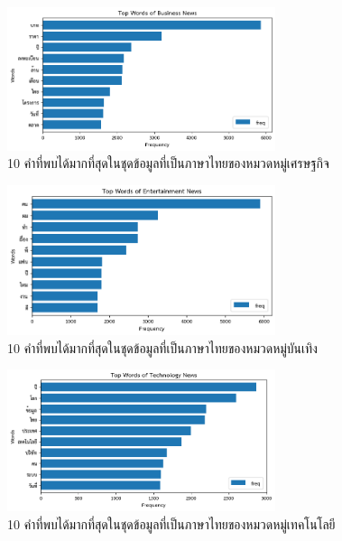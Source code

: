 \documentclass[12pt,oneside,openright,a4paper]{cpe-thai-project}
\begin{document}
        \newpage
        \begin{figure}[!ht]\centering
          \includegraphics[width=0.7\textwidth]{./img/thai_stat/money_bar.png}
          \caption{10 คำที่พบได้มากที่สุดในชุดข้อมูลที่เป็นภาษาไทยของหมวดหมู่เศรษฐกิจ}\label{fig:money_bar_th}
        \end{figure}
        \begin{figure}[!ht]\centering
          \includegraphics[width=0.7\textwidth]{./img/thai_stat/ent_bar.png}
          \caption{10 คำที่พบได้มากที่สุดในชุดข้อมูลที่เป็นภาษาไทยของหมวดหมู่บันเทิง}\label{fig:ent_bar_th}
        \end{figure}\begin{figure}[!ht]\centering
          \includegraphics[width=0.7\textwidth]{./img/thai_stat/tech_bar.png}
          \caption{10 คำที่พบได้มากที่สุดในชุดข้อมูลที่เป็นภาษาไทยของหมวดหมู่เทคโนโลยี}\label{fig:tech_bar_th}
        \end{figure}
        
\end{document}
